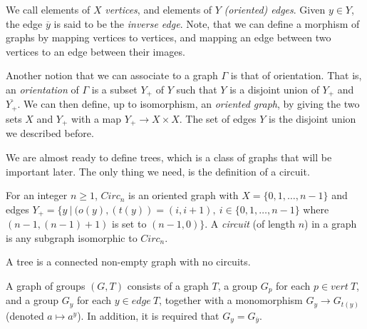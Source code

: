 We call elements of $X$ \emph{vertices}, and elements of $Y$ \emph{(oriented) edges}. Given $y \in Y$, the edge $\overline{y}$ is said to be the \emph{inverse edge}. Note, that we can define a morphism of graphs by mapping vertices to vertices, and mapping an edge between two vertices to an edge between their images.

Another notion that we can associate to a graph $\Gamma$ is that of orientation. That is, an \emph{orientation} of $\Gamma$ is a subset $Y_+$ of $Y$ such that $Y$ is a disjoint union of $Y_+$ and $\overline{Y_+}$. We can then define, up to isomorphism, an \emph{oriented graph}, by giving the two sets $X$ and $Y_+$ with a map $Y_+ \to X \times X$. The set of edges $Y$ is the disjoint union we described before.




We are almost ready to define trees, which is a class of graphs that will be important later. The only thing we need, is the definition of a circuit.

\begin{definition}
    For an integer $n \ge 1$, $Circ_n$ is an oriented graph with $X = \{0,1, \ldots , n-1 \}$ and edges $Y_+ = \{ y \:| \: (o(y),(t(y)) = (i,i+1), \: i\in \{0,1,\ldots,n-1\} $ where $(n-1, (n-1) + 1)$ is set to $(n-1,0)\}$. A \emph{circuit} (of length $n$) in a graph is any subgraph isomorphic to $Circ_n$.
\end{definition}

\begin{definition} 
    A tree is a connected non-empty graph with no circuits.
\end{definition}

\begin{definition}\label{grpgraph}
    A graph of groups $(G,T)$ consists of a graph $T$, a group $G_p$ for each $p \in vert\:T$, and a group $G_y$ for each $y \in edge\: T$, together with a monomorphism $G_y \to G_{t(y)}$ (denoted $a \mapsto a^y$). In addition, it is required that $G_y = G_{\overline{y}}$.
\end{definition}

